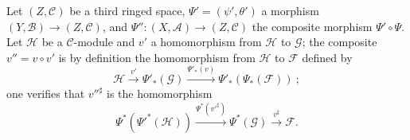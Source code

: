 \begin{env}[4.4.8]
\label{0.4.4.8}
Let $(Z,\mathcal{C})$ be a third ringed space,
$\Psi'=(\psi',\theta')$ a morphism $(Y,\mathcal{B})\to(Z,\mathcal{C})$, and
$\Psi'':(X,\mathcal{A})\to(Z,\mathcal{C})$ the composite morphism
$\Psi'\circ\Psi$. Let $\mathcal{H}$ be a $\mathcal{C}$-module and $v'$ a
homomorphism from $\mathcal{H}$ to $\mathcal{G}$; the composite
$v''=v\circ v'$ is by definition the homomorphism from $\mathcal{H}$ to
$\mathcal{F}$ defined by
\[
  \mathcal{H}\xrightarrow{v'}\Psi'_*(\mathcal{G})
  \xrightarrow{\Psi'_*(v)}\Psi'_*(\Psi_*(\mathcal{F}))~;
\]
one verifies that ${v''}^\sharp$ is the homomorphism
\[
  \Psi^*({\Psi'}^*(\mathcal{H}))
  \xrightarrow{\Psi^*({v'}^\sharp)}
  \Psi^*(\mathcal{G})
  \xrightarrow{v^\sharp}\mathcal{F}.
\]
\end{env}

